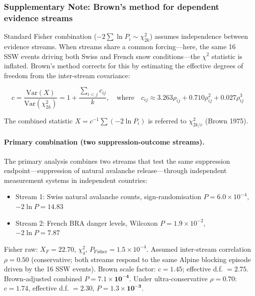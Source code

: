 \documentclass[11pt,letterpaper]{article}
\begin{document}
\subsubsection*{Supplementary Note: Brown's method for dependent evidence streams}

Standard Fisher combination ($-2\sum\ln P_i \sim \chi^2_{2k}$) assumes independence between evidence streams. When streams share a common forcing---here, the same 16 SSW events driving both Swiss and French snow conditions---the $\chi^2$ statistic is inflated. Brown's method\cite{Brown1975,Poole2016} corrects for this by estimating the effective degrees of freedom from the inter-stream covariance:

\begin{equation}
c = \frac{\mathrm{Var}(X)}{\mathrm{Var}(\chi^2_{2k})} = 1 + \frac{\sum_{i<j} c_{ij}}{k}, \quad
\text{where} \quad c_{ij} \approx 3.263 \rho_{ij} + 0.710 \rho_{ij}^2 + 0.027 \rho_{ij}^3
\end{equation}

The combined statistic $X = c^{-1}\sum(-2\ln P_i)$ is referred to $\chi^2_{2k/c}$ (Brown 1975).

\paragraph{Primary combination (two suppression-outcome streams).}
The primary analysis combines two streams that test the same suppression endpoint---suppression of natural avalanche release---through independent measurement systems in independent countries:
\begin{itemize}
  \item Stream 1: Swiss natural avalanche counts, sign-randomisation $P = 6.0\times10^{-4}$, $-2\ln P = 14.83$
  \item Stream 2: French BRA danger levels, Wilcoxon $P = 1.9\times10^{-2}$, $-2\ln P = 7.87$
\end{itemize}
Fisher raw: $X_F = 22.70$, $\chi^2_4$, $P_{\mathrm{Fisher}} = 1.5\times10^{-4}$.
Assumed inter-stream correlation $\rho = 0.50$ (conservative; both streams respond to the same Alpine blocking episode driven by the 16 SSW events). Brown scale factor: $c = 1.45$; effective d.f. $= 2.75$.
Brown-adjusted combined $P = \mathbf{7.1\times10^{-4}}$.
Under ultra-conservative $\rho = 0.70$: $c = 1.74$, effective d.f. $= 2.30$, $P = \mathbf{1.3\times10^{-3}}$.
\end{document}
